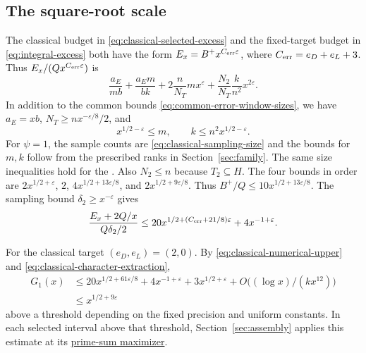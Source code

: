 \subsection{The square-root scale}

The classical budget in \eqref{eq:classical-selected-excess} and the
fixed-target budget in \eqref{eq:integral-excess} both have the form
\(E_x=B^+x^{C_{\rm err}\varepsilon}\), where \(C_{\rm err}=e_D+e_L+3\).
Thus \(E_x/(Qx^{C_{\rm err}\varepsilon})\) is
\[
 \frac{a_E}{mb}+\frac{a_E m}{bk}
     +2\frac{n}{N_T}m x^\varepsilon
     +\frac{N_2}{N_T}\frac{k}{n^2}x^{2\varepsilon}.
\]
In addition to the common bounds \eqref{eq:common-error-window-sizes},
we have \(a_E=xb\), \(N_T\ge nx^{-\varepsilon/8}/2\), and
\[
 x^{1/2-\varepsilon}\le m,\qquad k\le n^2x^{1/2-\varepsilon}.
\]
For \(\psi=1\), the sample counts are \eqref{eq:classical-sampling-size}
and the bounds for \(m,k\) follow from the prescribed ranks in
Section~\ref{sec:family}. The same size inequalities hold for the
.
Also \(N_2\le n\) because \(T_2\subseteq H\). The four bounds in order are
\(2x^{1/2+\varepsilon}\), \(2\),
\(4x^{1/2+13\varepsilon/8}\), and \(2x^{1/2+9\varepsilon/8}\).
Thus \(B^+/Q\le10x^{1/2+13\varepsilon/8}\). The sampling bound
\(\delta_2\ge x^{-\varepsilon}\) gives
\[
 \frac{E_x+2Q/x}{Q\delta_2/2}
   \le20x^{1/2+(C_{\rm err}+21/8)\varepsilon}+4x^{-1+\varepsilon}.
\]

For the classical target \((e_D,e_L)=(2,0)\). By
\eqref{eq:classical-numerical-upper} and
\eqref{eq:classical-character-extraction},
\begin{equation}
\label{eq:classical-fourier-pointwise}
 \begin{split}
 G_1(x)&\le20x^{1/2+61\varepsilon/8}+4x^{-1+\varepsilon}
            +3x^{1/2+\varepsilon}+O\bigl((\log x)/(kx^{12})\bigr)\\
       &\le x^{1/2+9\varepsilon}
 \end{split}
\end{equation}
above a threshold depending on the fixed precision and uniform
constants. In each selected interval above that threshold,
Section~\ref{sec:assembly} applies this estimate at its
\hyperlink{proof.apply-full-window}{prime-sum maximizer}.

